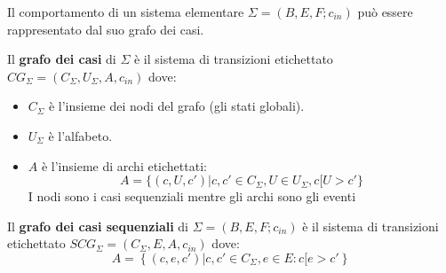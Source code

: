 Il comportamento di un sistema elementare $\Sigma = (B, E, F; c_{in})$ può essere
rappresentato dal suo grafo dei casi.
\begin{definizione}
    Il \textbf{grafo dei casi} di $\Sigma$ è il sistema di transizioni etichettato
    $CG_{\Sigma} = (C_{\Sigma},U_{\Sigma}, A, c_{in})$ dove:
    \begin{itemize}
        \item $C_{\Sigma}$ è l'insieme dei nodi del grafo (gli stati globali).
        \item $U_{\Sigma}$ è l'alfabeto.
        \item $A$ è l'insieme di archi etichettati:
              \begin{equation}
                  A = \{(c, U, c') | c, c' \in C_{\Sigma}, U \in U_{\Sigma}, c[U > c'\}
              \end{equation}
              I nodi sono i casi sequenziali mentre gli archi sono gli eventi
    \end{itemize}
\end{definizione}
\begin{definizione}
    Il \textbf{grafo dei casi sequenziali} di $\Sigma=(B,E,F;c_{in})$ è
    il sistema di transizioni etichettato $SCG_\Sigma=(C_\Sigma, E, A,c_{in})$
    dove:
    \begin{equation}
        A=\left\{(c,e,c')|c,c'\in C_\Sigma, e\in E: c[e>c' \right\}
    \end{equation}
\end{definizione}

